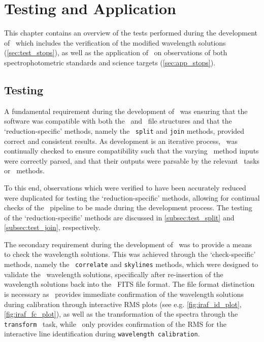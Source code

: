 \chapter{Testing and Application} \label{ch:04}

This chapter contains an overview of the tests performed during the development of \stops\ which includes the verification of the modified wavelength solutions (\autoref{sec:test_stops}), as well as the application of \stops\ on observations of both spectrophotometric standards and science targets (\autoref{sec:app_stops}).

\section[Testing \textsc{stops}]{Testing \stops} \label{sec:test_stops}



A fundamental requirement during the development of \stops\ was ensuring that the software was compatible with both the \polsalt\ and \iraf\ file structures and that the `reduction-specific' methods, namely the \stops\ \texttt{split} and \texttt{join} methods, provided correct and consistent results.
As development is an iterative process, \stops\ was continually checked to ensure compatibility such that the varying \stops\ method inputs were correctly parsed, and that their outputs were parsable by the relevant \iraf\ tasks or \polsalt\ methods.

To this end, observations which were verified to have been accurately reduced were duplicated for testing the `reduction-specific' methods, allowing for continual checks of the \stops\ pipeline to be made during the development process.
The testing of the `reduction-specific' methods are discussed in \autoref{subsec:test_split} and \autoref{subsec:test_join}, respectively.

The secondary requirement during the development of \stops\ was to provide a means to check the wavelength solutions.
This was achieved through the `check-specific' methods, namely the \stops\ \texttt{correlate} and \texttt{skylines} methods, which were designed to validate the \iraf\ wavelength solutions, specifically after re-insertion of the wavelength solutions back into the \polsalt\ \gls{FITS} file format.
The file format distinction is necessary as \iraf\ provides immediate confirmation of the wavelength solutions during calibration through interactive \gls{RMS} plots (see e.g. \autoref{fig:iraf_id_plot}, \ref{fig:iraf_fc_plot}), as well as the transformation of the spectra through the \texttt{transform} \iraf\ task, while \polsalt\ only provides confirmation of the \gls{RMS} for the interactive line identification during \texttt{wavelength calibration}.

